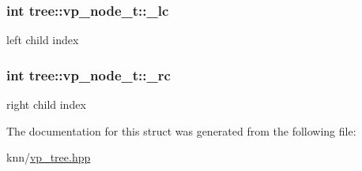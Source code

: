 \subsubsection[{\+\_\+lc}]{\setlength{\rightskip}{0pt plus 5cm}int tree\+::vp\+\_\+node\+\_\+t\+::\+\_\+lc}\label{structtree_1_1vp__node__t_a36ac11ce1caaf5d34aab924ee27158f4}
left child index \hypertarget{structtree_1_1vp__node__t_a733a0e18db87b13307818a3bbec8e154}{}
\subsubsection[{\+\_\+rc}]{\setlength{\rightskip}{0pt plus 5cm}int tree\+::vp\+\_\+node\+\_\+t\+::\+\_\+rc}\label{structtree_1_1vp__node__t_a733a0e18db87b13307818a3bbec8e154}
right child index 

The documentation for this struct was generated from the following file\+:\begin{DoxyCompactItemize}
\item 
knn/\hyperlink{vp__tree_8hpp}{vp\+\_\+tree.\+hpp}\end{DoxyCompactItemize}
